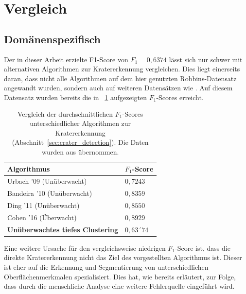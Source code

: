 
\section{Vergleich}
\label{sec:comparison}

\subsection{Domänenspezifisch}

Der in dieser Arbeit erzielte F1-Score von $F_1=0,6374$ lässt sich nur schwer mit alternativen Algorithmen zur Kratererkennung vergleichen. Dies liegt einerseits daran, dass nicht alle Algorithmen auf dem hier genutzten Robbins-Datensatz \cite{robbins_12} angewandt wurden, sondern auch auf weiteren Datensätzen wie \cite{bandeira_10}. Auf diesem Datensatz wurden bereits die in \tablename~\ref{tab:f1_comparision} aufgezeigten $F_1$-Scores erreicht.

\begin{table}[h!]
	\begin{tabularx}{\textwidth}{p{} >{\centering\arraybackslash}p{}}
		\toprule
		\textbf{Algorithmus} & \textbf{$F_1$-Score} \\
		\midrule
		Urbach '09 \cite{urbach_stepinski_2009} (Unüberwacht) & $0,7243$ \\
		Bandeira '10 \cite{bandeira_10} (Unüberwacht) & $0,8359$ \\
		Ding '11 \cite{ding_11} (Unüberwacht) & $0,8550$ \\
		Cohen '16 \cite{cohen_16} (Überwacht) & $0,8929$ \\
		\textbf{Unüberwachtes tiefes Clustering} & $0,63´74$\\
		\bottomrule
	\end{tabularx}
	\caption{Vergleich der durchschnittlichen $F_1$-Scores unterschiedlicher Algorithmen zur Kratererkennung (\vgl Abschnitt~\ref{sec:crater_detection}). Die Daten wurden aus \cite{cohen_16} übernommen.}
	\label{tab:f1_comparision}
\end{table}

Eine weitere Ursache für den vergleichsweise niedrigen $F_1$-Score ist, dass die direkte Kratererkennung nicht das Ziel des vorgestellten Algorithmus ist. Dieser ist eher auf die Erkennung und Segmentierung von unterschiedlichen Oberflächenmerkmalen spezialisiert. Dies hat, wie bereits erläutert, zur Folge, dass durch die menschliche Analyse eine weitere Fehlerquelle eingeführt wird.

